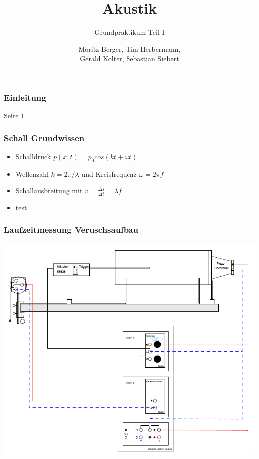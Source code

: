 \documentclass[12pt]{beamer}
\begin{document}
	\author{Moritz Berger, Tim Herbermann,\\ Gerald Kolter, Sebastian Siebert}
	\title{Akustik}
	\subtitle{Grundpraktikum Teil I}
	\frame[plain]{\maketitle}
	
	\begin{frame}
		\frametitle{Einleitung}
		Seite 1
	\end{frame}

	\begin{frame}
		\frametitle{Schall \qquad Grundwissen}
		\begin{itemize}
		\item Schalldruck  $p(x, t) = p_0 cos(kt + \omega t)$
		\item Wellenzahl $k = 2\pi / \lambda$ und Kreisfrequenz $\omega = 2\pi f$
		\item Schallausbreitung mit $v = \frac{\Delta s}{\Delta t} = \lambda f$
		\end{itemize}
		\begin{itemize}
		\item test
		\end{itemize}
		
		
	\end{frame}

	\begin{frame}
		\frametitle{Laufzeitmessung \qquad Veruschsaufbau}
		\begin{center}
			\includegraphics[width=0.8\linewidth]{aufbau_laufzeitmessung}
		\end{center}
	\end{frame}
\end{document}
